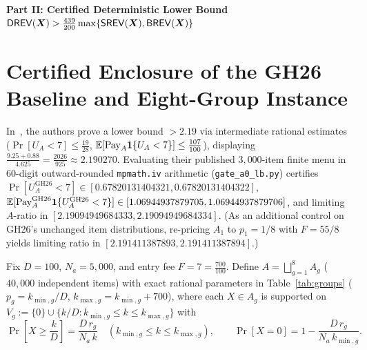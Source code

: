 \medskip
\noindent\textbf{Part II: Certified Deterministic Lower Bound $\mathsf{DREV}(\bm{X}) > \frac{439}{200}\max\{\mathsf{SREV}(\bm{X}), \mathsf{BREV}(\bm{X})\}$}
\medskip

\section{Certified Enclosure of the GH26 Baseline and Eight-Group Instance}\label{sec:lb-instance}

\begin{remark}\label{rem:gh26-unrounded}
In~\cite[Theorem~D.1, Appendix~D]{GiannakopoulosHahn26}, the authors prove a lower bound $> 2.19$ via intermediate rational estimates ($\Pr[U_A < 7] \le \frac{19}{28}$, $\mathbb{E}[\mathrm{Pay}_A\mathbf{1}\{U_A < 7\}] \le \frac{107}{100}$), displaying $\frac{9.25 + 0.88}{4.625} = \frac{2026}{925} \approx 2.190270$. Evaluating their published $3{,}000$-item finite menu in $60$-digit outward-rounded \texttt{mpmath.iv} arithmetic (\texttt{gate\_a0\_lb.py}) certifies $\Pr[U_A^{\mathrm{GH26}} < 7] \in [0.67820131404321, 0.67820131404322]$, $\mathbb{E}[\mathrm{Pay}_A^{\mathrm{GH26}}\mathbf{1}\{U_A^{\mathrm{GH26}} < 7\}] \in [1.06944937879705, 1.06944937879706]$, and limiting $A$-ratio in $[2.19094949684333, 2.19094949684334]$. (As an additional control on GH26's unchanged item distributions, re-pricing $A_1$ to $p_1 = 1/8$ with $F = 55/8$ yields limiting ratio in $[2.191411387893, 2.191411387894]$.)
\end{remark}

Fix $D = 100$, $N_a = 5{,}000$, and entry fee $F = 7 = \frac{700}{100}$. Define $A = \bigsqcup_{g=1}^8 A_g$ ($40{,}000$ independent items) with exact rational parameters in Table~\ref{tab:groups} ($p_g = k_{\min,g}/D$, $k_{\max,g} = k_{\min,g} + 700$), where each $X \in A_g$ is supported on $V_g := \{0\} \cup \{k/D : k_{\min,g} \le k \le k_{\max,g}\}$ with
\begin{equation}\label{eq:item-dist}
  \Pr\!\left[X \ge \frac{k}{D}\right] = \frac{D\, r_g}{N_a\, k} \quad (k_{\min,g} \le k \le k_{\max,g}), \qquad
  \Pr[X = 0] = 1 - \frac{D\, r_g}{N_a\, k_{\min,g}}.
\end{equation}

